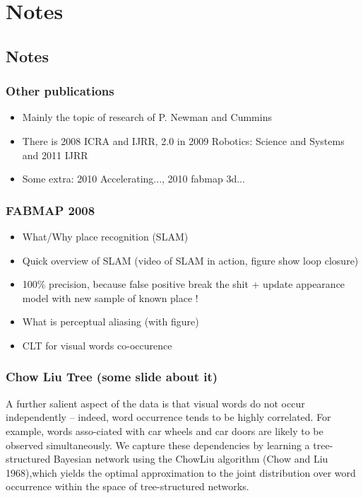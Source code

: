 \section{Notes}

\subsection{Notes}

\begin{frame}
    \frametitle{Other publications}
    \begin{itemize}
        \item Mainly the topic of research of P. Newman and Cummins
        \item There is 2008 ICRA and IJRR, 2.0 in 2009 Robotics: Science and Systems and 2011 IJRR
        \item Some extra: 2010 Accelerating..., 2010 fabmap 3d...
    \end{itemize}
\end{frame}

\begin{frame}
    \frametitle{FABMAP 2008}
    \begin{itemize}
        \item What/Why place recognition (SLAM)
        \item Quick overview of SLAM (video of SLAM in action, figure show loop closure)
        \item 100\% precision, because false positive break the shit + update appearance model with new sample of known place !
        \item What is perceptual aliasing (with figure)
        \item CLT for visual words co-occurence
    \end{itemize}
\end{frame}

\begin{frame}
    \frametitle{Chow Liu Tree (some slide about it)}
    A further salient aspect of the data is that visual words do not occur independently – indeed, word occurrence tends to be highly correlated. For example, words asso-ciated with car wheels and car doors are likely to be observed simultaneously. We capture these dependencies by learning a tree-structured Bayesian network using the ChowLiu algorithm (Chow and Liu 1968),which yields the optimal approximation to the joint distribution over word occurrence within the space of tree-structured networks.
\end{frame}


